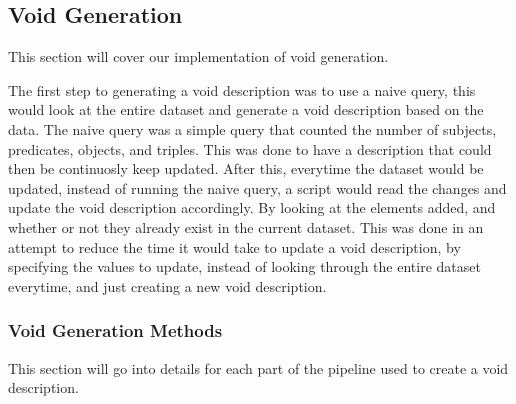 \subsection{Void Generation}\label{sec:void}
This section will cover our implementation of void generation.

The first step to generating a \gls{void} description was to use a naive query, this would look at the entire dataset and generate a \gls{void} description based on the data. The naive query was a simple query that counted the number of subjects, predicates, objects, and triples. This was done to have a description that could then be continuosly keep updated. After this, everytime the dataset would be updated, instead of running the naive query, a script would read the changes and update the \gls{void} description accordingly. By looking at the elements added, and whether or not they already exist in the current dataset. This was done in an attempt to reduce the time it would take to update a \gls{void} description, by specifying the values to update, instead of looking through the entire dataset everytime, and just creating a new \gls{void} description.

\subsubsection{Void Generation Methods}\label{sec:voidmethods}
This section will go into details for each part of the pipeline used to create a void description.



